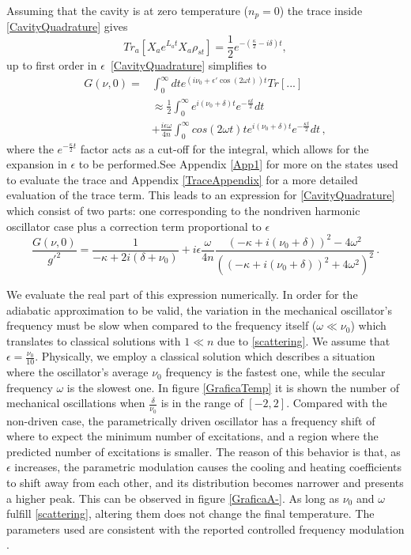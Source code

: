\documentclass[reprint, amsmath,amssymb, aps,pra]{revtex4-1}
\begin{document}
Assuming that the cavity is at zero temperature ($n_p=0$) the trace
inside \eqref{CavityQuadrature} gives
\begin{equation}
Tr_a[X_a e^{L_a t} X_a \rho_{st}] = \frac{1}{2}e^{-(\frac{\kappa}{2}-i\delta) t},
\end{equation} 
up to first order in $\epsilon$~\eqref{CavityQuadrature} simplifies to
\begin{align}
  G(\nu,0)=&\int_0^\infty dt e^{(i\nu_0 +\epsilon'\cos{(2\omega t)})t }Tr[...]\nonumber\\
           &\approx\frac{1}{2}\int_0^\infty e^{i (\nu_0+\delta)
             t}e^{-\frac{\kappa t}{2}}dt\nonumber\\
           &+\frac{i\epsilon \omega}{4n}\int_0^\infty cos(2\omega t)t e^{i (\nu_0+\delta)
             t}e^{-\frac{\kappa t}{2}}dt\, ,\nonumber
\end{align}
where the $e^{-\frac{\kappa}{2} t}$ factor acts as a cut-off for the integral, which
allows for the expansion in $\epsilon$ to be performed.See Appendix
\ref{App1} for more on the states used to evaluate the trace and Appendix \ref{TraceAppendix} for a more detailed evaluation of the trace term. This leads
to an expression for \eqref{CavityQuadrature} which consist of two
parts: one corresponding to the nondriven harmonic oscillator case
plus a correction term proportional to $\epsilon$
\begin{equation}
\frac{G(\nu,0)}{g'^2}= \frac{1}{-\kappa + 2i(\delta + \nu_0)} +i\epsilon\frac{\omega}{4n}\frac{(-\kappa + i(\nu_0 + \delta))^2 - 4\omega^2}{((-\kappa + i(\nu_0 + \delta))^2 + 4\omega^2)^2}\, .
\end{equation} %

We evaluate the real part of this expression numerically. In order for
the adiabatic approximation to be valid, the variation in the
mechanical oscillator's frequency must be slow when compared to the
frequency itself ($\omega \ll \nu_0$) which translates to classical
solutions with $1 \ll n$ due to \eqref{scattering}. We assume that
$\epsilon = \frac{\nu_0}{10}$. Physically,
we employ a classical solution which describes a situation where the
oscillator's average $\nu_0$ frequency is the fastest one, while the
secular frequency $\omega$ is the slowest one. In figure \ref{GraficaTemp} it is shown the
number of mechanical oscillations when $\frac{\delta}{\nu_0}$ is in
the range of $[-2,2]$. Compared with the non-driven case, the
parametrically driven oscillator has a frequency shift of where to
expect the minimum number of excitations, and a region where the
predicted number of excitations is smaller. The reason of this
behavior is that, as $\epsilon$ increases, the parametric modulation
causes the cooling and heating coefficients to shift away from each
other, and its distribution becomes narrower and presents a higher
peak. This can be observed in figure \ref{GraficaA-}. As long as
$\nu_0$ and $\omega$ fulfill \eqref{scattering}, altering them does
not change the final temperature. The parameters used are consistent
with the reported controlled frequency modulation
\cite{WoolleyNM}\cite{JockelS}. 
\end{document}
